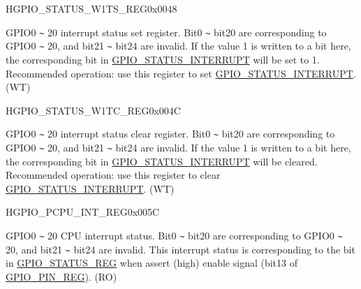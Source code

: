 \begin{register}{H}{GPIO\_STATUS\_W1TS\_REG}{0x0048}\label{regdesc:GPIOSTATUSW1TSREG}
%
%
\regnewline%
\begin{regdesc}\begin{reglist}
\label{fielddesc:GPIOSTATUSW1TS}\item [GPIO\_STATUS\_W1TS] GPIO0 \verb+~+ 20 interrupt status set register. Bit0 \verb+~+ bit20 are corresponding to GPIO0 \verb+~+ 20, and bit21 \verb+~+ bit24 are invalid. If the value 1 is written to a bit here, the corresponding bit in \hyperref[fielddesc:GPIOSTATUSINTERRUPT]{GPIO\_STATUS\_INTERRUPT} will be set to 1. Recommended operation: use this register to set \hyperref[fielddesc:GPIOSTATUSINTERRUPT]{GPIO\_STATUS\_INTERRUPT}. (WT)
\end{reglist}\end{regdesc}
\end{register}


\begin{register}{H}{GPIO\_STATUS\_W1TC\_REG}{0x004C}\label{regdesc:GPIOSTATUSW1TCREG}
%
%
\regnewline%
\begin{regdesc}\begin{reglist}
\label{fielddesc:GPIOSTATUSW1TC}\item [GPIO\_STATUS\_W1TC] GPIO0 \verb+~+ 20 interrupt status clear register. Bit0 \verb+~+ bit20 are corresponding to GPIO0 \verb+~+ 20, and bit21 \verb+~+ bit24 are invalid.  If the value 1 is written to a bit here, the corresponding bit in \hyperref[fielddesc:GPIOSTATUSINTERRUPT]{GPIO\_STATUS\_INTERRUPT} will be cleared. Recommended operation: use this register to clear \hyperref[fielddesc:GPIOSTATUSINTERRUPT]{GPIO\_STATUS\_INTERRUPT}. (WT)
\end{reglist}\end{regdesc}
\end{register}


\begin{register}{H}{GPIO\_PCPU\_INT\_REG}{0x005C}\label{regdesc:GPIOPCPUINTREG}
%
%
\regnewline%
\begin{regdesc}\begin{reglist}
\label{fielddesc:GPIOPROCPUINT}\item [GPIO\_PROCPU\_INT]

GPIO0 \verb+~+ 20 CPU interrupt status. Bit0 \verb+~+ bit20 are corresponding to GPIO0 \verb+~+ 20, and bit21 \verb+~+ bit24 are invalid. This interrupt status is corresponding to the bit in \hyperref[regdesc:GPIOSTATUSREG]{GPIO\_STATUS\_REG} when assert (high) enable signal (bit13 of \hyperref[regdesc:GPIOPINNREG]{GPIO\_PIN\_REG}). (RO)
\end{reglist}\end{regdesc}
\end{register}




